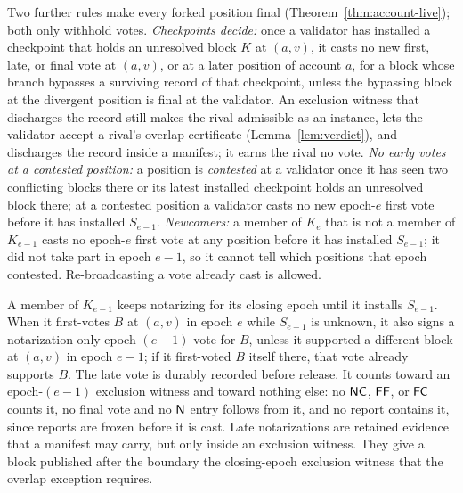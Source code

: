 Two further rules make every forked position final (Theorem~\ref{thm:account-live}); both only withhold votes. \emph{Checkpoints decide:} once a validator has installed a checkpoint that holds an unresolved block $K$ at $(a,v)$, it casts no new first, late, or final vote at $(a,v)$, or at a later position of account $a$, for a block whose branch bypasses a surviving record of that checkpoint, unless the bypassing block at the divergent position is final at the validator. An exclusion witness that discharges the record still makes the rival admissible as an instance, lets the validator accept a rival's overlap certificate (Lemma~\ref{lem:verdict}), and discharges the record inside a manifest; it earns the rival no vote. \emph{No early votes at a contested position:} a position is \emph{contested} at a validator once it has seen two conflicting blocks there or its latest installed checkpoint holds an unresolved block there; at a contested position a validator casts no new epoch-$e$ first vote before it has installed $S_{e-1}$. \emph{Newcomers:} a member of $K_e$ that is not a member of $K_{e-1}$ casts no epoch-$e$ first vote at any position before it has installed $S_{e-1}$; it did not take part in epoch $e-1$, so it cannot tell which positions that epoch contested. Re-broadcasting a vote already cast is allowed.

A member of $K_{e-1}$ keeps notarizing for its closing epoch until it installs $S_{e-1}$. When it first-votes $B$ at $(a,v)$ in epoch $e$ while $S_{e-1}$ is unknown, it also signs a notarization-only epoch-$(e-1)$ vote for $B$, unless it supported a different block at $(a,v)$ in epoch $e-1$; if it first-voted $B$ itself there, that vote already supports $B$. The late vote is durably recorded before release. It counts toward an epoch-$(e-1)$ exclusion witness and toward nothing else: no $\mathsf{NC}$, $\mathsf{FF}$, or $\mathsf{FC}$ counts it, no final vote and no $\mathsf{N}$ entry follows from it, and no report contains it, since reports are frozen before it is cast. Late notarizations are retained evidence that a manifest may carry, but only inside an exclusion witness. They give a block published after the boundary the closing-epoch exclusion witness that the overlap exception requires.

